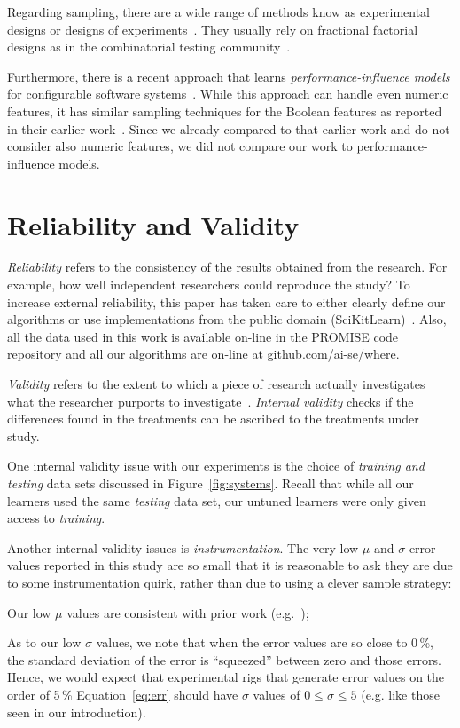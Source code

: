 \documentclass{newsig}
\newcommand{\fig}[1]{Figure~\ref{fig:#1}}
\newcommand{\eq}[1]{Equation~\ref{eq:#1}}
\begin{document}
Regarding sampling, there are a wide range of methods know as experimental designs or designs of experiments~\cite{pukelsheim2006optimal}. They usually rely on fractional factorial designs as in the combinatorial testing community~\cite{Kuhn:2013}. 

Furthermore, there is a recent approach that learns {\em performance-influence models} for configurable software systems~\cite{SGA+15}. While this approach can handle even numeric features, it has similar sampling techniques for the Boolean features as reported in their earlier work~\cite{siegmund2012predicting}. Since we already compared to that earlier work and do not consider also numeric features, we did not compare our work to performance-influence models.
 


\section{Reliability and Validity}\label{sect:construct}

{\em Reliability} refers to the consistency of the results obtained
from the research.  For example,   how well independent researchers
could reproduce the study? To increase external
reliability, this paper has taken care to either  clearly define our
algorithms or use implementations from the public domain
(SciKitLearn)~\cite{scikit-learn}. Also, all the data used in this work is available
on-line in the PROMISE code repository and all our algorithms
are on-line at github.com/ai-se/where.

{\em Validity} refers to the extent to which a piece of research actually
investigates what the researcher purports to investigate~\cite{SSA15}.
{\em Internal validity} checks if the differences found in
the treatments can be ascribed to the treatments under study. 

One internal validity issue with our experiments is the choice
of {\em training and testing} data sets discussed in 
\fig{systems}. Recall that while all our learners used the same
{\em testing} data set, our untuned learners were only given
access to {\em training}.

Another internal validity issues is {\em instrumentation}. The very low $\mu$ and $\sigma$ error values
reported in this study are so small that it is reasonable to ask they are due to some instrumentation
quirk, rather than due to using a clever sample strategy:
\begin{compactitem}
\item
Our low $\mu$ values are consistent with prior work (e.g.~\cite{sarkar2015cost});
\item
As to our low $\sigma$ values, we note that when the  error values are so close to 0\,\%, the standard
deviation of the error is ``squeezed'' between zero and those errors. Hence, we would expect that
experimental rigs
that generate error values on the order of 5\,\% \eq{err} should have $\sigma$ values of $0\le \sigma \le 5$ (e.g. like those seen in our introduction).
\end{compactitem}
\end{document}
